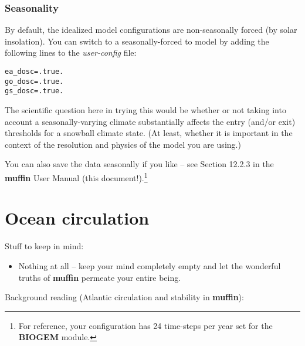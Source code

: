 \documentclass[11pt,fleqn]{book} %
\begin{document}
\subsection{Seasonality}

By default, the idealized model configurations are non-seasonally forced (by solar insolation). You can switch to a seasonally-forced to model by adding the following lines to the \textit{user-config} file:

\vspace{-3mm}
\begin{verbatim}
ea_dosc=.true.
go_dosc=.true.
gs_dosc=.true.
\end{verbatim}
\vspace{-2mm}

The scientific question here in trying this would be whether or not taking into account a seasonally-varying climate substantially affects the entry (and/or exit) thresholds for a snowball climate state. (At least, whether it is important in the context of the resolution and physics of the model you are using.)

You can also save the data seasonally if you like – see Section 12.2.3 in the \textbf{muffin} User Manual (this document!).\footnote{For reference, your configuration has 24 time-steps per year set for the \textbf{BIOGEM} module.}


\cleardoublepage


\chapter{Ocean circulation}\label{ch:ocean-circulation}

\hfill \break

\noindent Stuff to keep in mind:

\begin{itemize}
\item Nothing at all – keep your mind completely empty and let the wonderful truths of \textbf{muffin} permeate your entire being.
\end{itemize}

\vspace{2mm}
\noindent Background reading (Atlantic circulation and stability in \textbf{muffin}):
\end{document}
